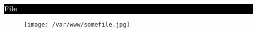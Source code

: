 \documentclass{book}
\begin{document}
{\normalfont\huge\bfseries}{}{\colorbox{black}{\parbox{\dimexpr\textwidth-2\fboxsep\relax}{\textcolor{white}{\textbf{File}}}}}
\vspace{-0.5cm}      
  \begin{figure}[h!]
          \texttt{[image: /var/www/somefile.jpg]}
          \centering
            \label{fig:somefile.jpg}
  \end{figure}

  \newpage

  
\end{document}
